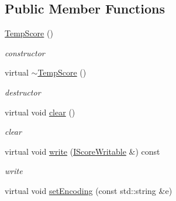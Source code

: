 \subsection*{\-Public \-Member \-Functions}
\begin{DoxyCompactItemize}
\item 
\hypertarget{classsinsy_1_1TempScore_a47727b37c6f229cf01ef456e0ac2337a}{\hyperlink{classsinsy_1_1TempScore_a47727b37c6f229cf01ef456e0ac2337a}{\-Temp\-Score} ()}\label{classsinsy_1_1TempScore_a47727b37c6f229cf01ef456e0ac2337a}

\begin{DoxyCompactList}\small\item\em constructor \end{DoxyCompactList}\item 
\hypertarget{classsinsy_1_1TempScore_a24397560d04ca9a85a7a62cc2b6376b9}{virtual \hyperlink{classsinsy_1_1TempScore_a24397560d04ca9a85a7a62cc2b6376b9}{$\sim$\-Temp\-Score} ()}\label{classsinsy_1_1TempScore_a24397560d04ca9a85a7a62cc2b6376b9}

\begin{DoxyCompactList}\small\item\em destructor \end{DoxyCompactList}\item 
\hypertarget{classsinsy_1_1TempScore_a47010b736dc38d71b14f6086588b15a0}{virtual void \hyperlink{classsinsy_1_1TempScore_a47010b736dc38d71b14f6086588b15a0}{clear} ()}\label{classsinsy_1_1TempScore_a47010b736dc38d71b14f6086588b15a0}

\begin{DoxyCompactList}\small\item\em clear \end{DoxyCompactList}\item 
\hypertarget{classsinsy_1_1TempScore_a51c129629b33b95bd37be34da9b0a080}{virtual void \hyperlink{classsinsy_1_1TempScore_a51c129629b33b95bd37be34da9b0a080}{write} (\hyperlink{classsinsy_1_1IScoreWritable}{\-I\-Score\-Writable} \&) const }\label{classsinsy_1_1TempScore_a51c129629b33b95bd37be34da9b0a080}

\begin{DoxyCompactList}\small\item\em write \end{DoxyCompactList}\item 
\hypertarget{classsinsy_1_1TempScore_a02321c0dcc624481b9c06d856c5e21eb}{virtual void \hyperlink{classsinsy_1_1TempScore_a02321c0dcc624481b9c06d856c5e21eb}{set\-Encoding} (const std\-::string \&e)}\label{classsinsy_1_1TempScore_a02321c0dcc624481b9c06d856c5e21eb}


\end{DoxyCompactItemize}
